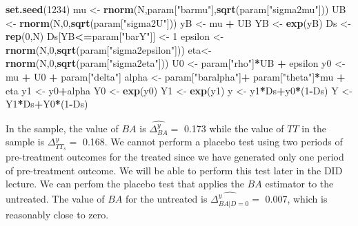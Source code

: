\documentclass[]{book}
\newenvironment{Shaded}{\begin{snugshade}}{\end{snugshade}}
\newcommand{\KeywordTok}[1]{\textcolor[rgb]{0.13,0.29,0.53}{\textbf{#1}}}
\newcommand{\DecValTok}[1]{\textcolor[rgb]{0.00,0.00,0.81}{#1}}
\newcommand{\StringTok}[1]{\textcolor[rgb]{0.31,0.60,0.02}{#1}}
\newcommand{\OperatorTok}[1]{\textcolor[rgb]{0.81,0.36,0.00}{\textbf{#1}}}
\newcommand{\NormalTok}[1]{#1}
\theoremstyle{definition}
\theoremstyle{definition}
\theoremstyle{definition}
\theoremstyle{remark}
\begin{document}
\begin{Shaded}
\begin{Highlighting}[]
\KeywordTok{set.seed}\NormalTok{(}\DecValTok{1234}\NormalTok{)}
\NormalTok{mu <-}\StringTok{ }\KeywordTok{rnorm}\NormalTok{(N,param[}\StringTok{"barmu"}\NormalTok{],}\KeywordTok{sqrt}\NormalTok{(param[}\StringTok{"sigma2mu"}\NormalTok{]))}
\NormalTok{UB <-}\StringTok{ }\KeywordTok{rnorm}\NormalTok{(N,}\DecValTok{0}\NormalTok{,}\KeywordTok{sqrt}\NormalTok{(param[}\StringTok{"sigma2U"}\NormalTok{]))}
\NormalTok{yB <-}\StringTok{ }\NormalTok{mu }\OperatorTok{+}\StringTok{ }\NormalTok{UB }
\NormalTok{YB <-}\StringTok{ }\KeywordTok{exp}\NormalTok{(yB)}
\NormalTok{Ds <-}\StringTok{ }\KeywordTok{rep}\NormalTok{(}\DecValTok{0}\NormalTok{,N)}
\NormalTok{Ds[YB}\OperatorTok{<=}\NormalTok{param[}\StringTok{"barY"}\NormalTok{]] <-}\StringTok{ }\DecValTok{1} 
\NormalTok{epsilon <-}\StringTok{ }\KeywordTok{rnorm}\NormalTok{(N,}\DecValTok{0}\NormalTok{,}\KeywordTok{sqrt}\NormalTok{(param[}\StringTok{"sigma2epsilon"}\NormalTok{]))}
\NormalTok{eta<-}\StringTok{ }\KeywordTok{rnorm}\NormalTok{(N,}\DecValTok{0}\NormalTok{,}\KeywordTok{sqrt}\NormalTok{(param[}\StringTok{"sigma2eta"}\NormalTok{]))}
\NormalTok{U0 <-}\StringTok{ }\NormalTok{param[}\StringTok{"rho"}\NormalTok{]}\OperatorTok{*}\NormalTok{UB }\OperatorTok{+}\StringTok{ }\NormalTok{epsilon}
\NormalTok{y0 <-}\StringTok{ }\NormalTok{mu }\OperatorTok{+}\StringTok{  }\NormalTok{U0 }\OperatorTok{+}\StringTok{ }\NormalTok{param[}\StringTok{"delta"}\NormalTok{]}
\NormalTok{alpha <-}\StringTok{ }\NormalTok{param[}\StringTok{"baralpha"}\NormalTok{]}\OperatorTok{+}\StringTok{  }\NormalTok{param[}\StringTok{"theta"}\NormalTok{]}\OperatorTok{*}\NormalTok{mu }\OperatorTok{+}\StringTok{ }\NormalTok{eta}
\NormalTok{y1 <-}\StringTok{ }\NormalTok{y0}\OperatorTok{+}\NormalTok{alpha}
\NormalTok{Y0 <-}\StringTok{ }\KeywordTok{exp}\NormalTok{(y0)}
\NormalTok{Y1 <-}\StringTok{ }\KeywordTok{exp}\NormalTok{(y1)}
\NormalTok{y <-}\StringTok{ }\NormalTok{y1}\OperatorTok{*}\NormalTok{Ds}\OperatorTok{+}\NormalTok{y0}\OperatorTok{*}\NormalTok{(}\DecValTok{1}\OperatorTok{-}\NormalTok{Ds)}
\NormalTok{Y <-}\StringTok{ }\NormalTok{Y1}\OperatorTok{*}\NormalTok{Ds}\OperatorTok{+}\NormalTok{Y0}\OperatorTok{*}\NormalTok{(}\DecValTok{1}\OperatorTok{-}\NormalTok{Ds)}
\end{Highlighting}
\end{Shaded}

In the sample, the value of \(BA\) is \(\hat{\Delta^y_{BA}}=\) 0.173
while the value of \(TT\) in the sample is \(\Delta^y_{TT_s}=\) 0.168.
We cannot perform a placebo test using two periods of pre-treatment
outcomes for the treated since we have generated only one period of
pre-treatment outcome. We will be able to perform this test later in the
DID lecture. We can perfom the placebo test that applies the \(BA\)
estimator to the untreated. The value of \(BA\) for the untreated is
\(\hat{\Delta^y_{BA|D=0}}=\) 0.007, which is reasonably close to zero.
\end{document}
